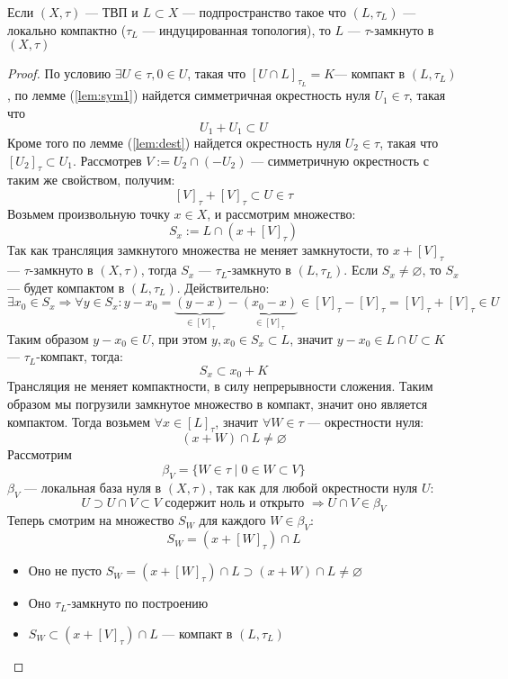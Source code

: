 \begin{claim}
	\label{claim:localcompact}
	Если $(X, \tau)$ --- ТВП и $L \subset X$ --- подпространство такое что $(L, \tau_L)$ --- локально компактно ($\tau_L$ --- индуцированная топология), то $L$ --- $\tau$-замкнуто в $(X,\tau)$
\end{claim}
\begin{proof}
	По условию $\exists U \in \tau, 0 \in U$, такая что $[U \cap L]_{\tau_L} = K$--- компакт в $(L, \tau_L)$, по лемме (\ref{lem:sym1}) найдется симметричная окрестность нуля $U_1 \in \tau$, такая что
	$$
	U_1 + U_1 \subset U
	$$
	Кроме того по лемме (\ref{lem:dest}) найдется окрестность нуля $U_2 \in \tau$, такая что $[U_2]_\tau \subset U_1$. Рассмотрев $V:= U_2\cap (-U_2)$ --- симметричную окрестность с таким же свойством, получим:
	$$
	[V]_\tau + [V]_\tau \subset U \in \tau
	$$
	Возьмем произвольную точку $x \in X$, и рассмотрим множество:
	$$
	S_x := L \cap (x + [V]_\tau)
	$$
	Так как трансляция замкнутого множества не меняет замкнутости, то $x + [V]_\tau$ --- $\tau$-замкнуто в $(X, \tau)$, тогда $S_x$ --- $\tau_L$-замкнуто в $(L, \tau_L)$. Если $S_x \neq \varnothing$, то $S_x$ --- будет компактом в $(L, \tau_L)$. Действительно:
	$$
	\exists x_0 \in S_x \Rightarrow \forall y \in S_x: y - x_0 = \underbrace{(y-x)}_{\in [V]_\tau} - \underbrace{(x_0-x)}_{\in [V]_\tau}\in [V]_\tau - [V]_\tau = [V]_\tau + [V]_\tau \in U
	$$
	Таким образом $y - x_0 \in U$,  при этом $y,x_0 \in S_x \subset L$, значит $y- x_0 \in L\cap U \subset K$ --- $\tau_L$-компакт,  тогда:
	$$
	S_x \subset x_0 + K
	$$
	Трансляция не меняет компактности, в силу непрерывности сложения. Таким образом мы погрузили замкнутое множество в компакт, значит оно является компактом.
	Тогда возьмем $\forall x \in [L]_\tau$, значит $\forall W \in \tau$ --- окрестности нуля:
	$$
	(x + W)\cap L \neq \varnothing
	$$
	Рассмотрим 
	$$
	\beta_V = \{W \in \tau \mid 0 \in W\subset V\}
	$$
	$\beta_V$ --- локальная база нуля в $(X, \tau)$, так как для любой окрестности нуля $U$:
	$$
	U \supset U \cap V \subset V  \text{ содержит ноль и открыто } \Rightarrow  U \cap V \in \beta_V
	$$
	Теперь смотрим на множество $S_W$ для каждого $W \in \beta_V$:
	$$
	S_W = (x + [W]_\tau)\cap L 
	$$ 
	\begin{itemize}
		\item Оно не пусто $ S_W = (x + [W]_\tau)\cap L \supset (x+ W)\cap L \neq \varnothing$
		\item Оно $\tau_L$-замкнуто по построению 
		\item $S_W \subset (x + [V]_\tau)\cap L$ --- компакт в $(L, \tau_L)$

\end{itemize}
\end{proof}
